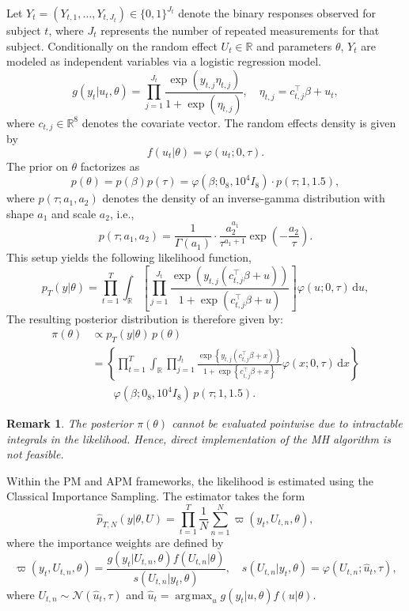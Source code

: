 \documentclass[pdflatex,sn-mathphys-num]{sn-jnl}
\DeclareMathOperator*{\argmax}{\arg\!\max}
\theoremstyle{thmstyleone}
\theoremstyle{thmstyletwo}
\newtheorem{remark}{Remark}
\theoremstyle{thmstylethree}
\begin{document}
Let \( Y_t = (Y_{t,1}, \dots, Y_{t,J_t}) \in \{0,1\}^{J_t} \) denote the binary responses observed for subject \( t \), where \( J_t \) represents the number of repeated measurements for that subject. Conditionally on the random effect \( U_t \in \mathbb{R} \) and parameters \( \theta \), \( Y_t \) are modeled as independent variables via a logistic regression model.
\[
g(y_t | u_t, \theta) = \prod_{j=1}^{J_t} \frac{\exp(y_{t,j} \eta_{t,j})}{1 + \exp(\eta_{t,j})}, \quad \eta_{t,j} = c_{t,j}^\top \beta + u_t,
\]
where \( c_{t,j} \in \mathbb{R}^{8} \) denotes the covariate vector. The random effects density is given by
\[
f(u_t | \theta) = \varphi(u_t; 0, \tau).
\]
The prior on \( \theta \) factorizes as
\[
p(\theta) = p(\beta) p(\tau) = \varphi(\beta; 0_{8}, 10^4 I_{8}) \cdot p(\tau; 1, 1.5),
\]
where \( p(\tau; a_1, a_2) \) denotes the density of an inverse-gamma distribution with shape \( a_1 \) and scale \( a_2 \), i.e.,
\[
p(\tau; a_1, a_2) = \frac{1}{\Gamma(a_1)} \cdot \frac{a_2^{a_1}}{\tau^{a_1 + 1}} \exp\left( -\frac{a_2}{\tau} \right).
\]
This setup yields the following likelihood function,
\[
p_T(y | \theta) = \prod_{t=1}^T \int_{\mathbb{R}} \left[ \prod_{j=1}^{J_t} \frac{\exp(y_{t,j}(c_{t,j}^\top \beta + u))}{1 + \exp(c_{t,j}^\top \beta + u)} \right] \varphi(u; 0, \tau) \, \mathrm{d}u,
\]
The resulting posterior distribution is therefore given by:
\begin{align*}
    \pi(\theta) 
    &\propto p_T(y | \theta) \, p(\theta) \\
    &= \left\{ \prod_{t=1}^T \int_{\mathbb{R}} \prod_{j=1}^{J_t} \frac{\exp \left\{ y_{t,j}(c_{t,j}^\top \beta + x) \right\}}{1+\exp \left\{ c_{t,j}^\top \beta + x \right\}} \varphi(x; 0, \tau) \, \mathrm{d}x \right\} \\
    &\qquad  \varphi(\beta; 0_{8}, 10^4 I_{8}) \, p(\tau; 1, 1.5).
\end{align*}

\begin{remark}
The posterior \( \pi(\theta) \) cannot be evaluated pointwise due to intractable integrals in the likelihood. Hence, direct implementation of the MH algorithm is not feasible.
\end{remark}
\noindent
Within the PM and APM frameworks, the likelihood is estimated using the Classical Importance Sampling. The estimator takes the form
\[
\widehat{p}_{T,N}(y | \theta, U) = \prod_{t=1}^T  \frac{1}{N} \sum_{n=1}^N \varpi(y_t, U_{t,n}, \theta),
\]
where the importance weights are defined by
\[
\varpi(y_t, U_{t,n}, \theta) = \frac{g(y_t | U_{t,n}, \theta) f(U_{t,n} | \theta)}{s(U_{t,n} | y_t, \theta)}, \quad s(U_{t,n} | y_t, \theta) = \varphi(U_{t,n}; \hat{u}_t, \tau),
\]
where \( U_{t,n} \sim \mathcal{N}(\hat{u}_t, \tau) \) and \( \hat{u}_t = \argmax_{u}  g(y_t | u, \theta) f(u | \theta) \).
\end{document}
